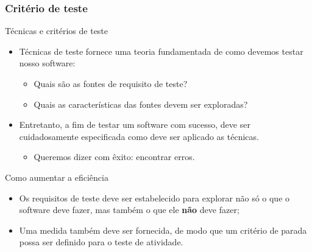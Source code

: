 \begin{frame}[parent={cmap:software-testing-foundations}, hasprev=false, hasnext=true]
\frametitle{Critério de teste}

\begin{block:fact}{Técnicas e critérios de teste}
\begin{itemize}
	\item Técnicas de teste fornece uma teoria fundamentada de como devemos testar nosso software:
	\begin{itemize}
		\item Quais são as fontes de requisito de teste?

		\item Quais as características das fontes devem ser exploradas?
	\end{itemize}

	\item Entretanto, a fim de testar um software com sucesso, deve ser cuidadosamente especificada como deve ser aplicado as técnicas.
	\begin{itemize}
		\item Queremos dizer com êxito: encontrar erros.
	\end{itemize}
\end{itemize}
\end{block:fact}


\begin{block:fact}{Como aumentar a eficiência}
\begin{itemize}
	\item {\small Os requisitos de teste deve ser estabelecido para explorar não só o que o software deve fazer, mas também o que ele \textbf{não} deve fazer;}

	\item {\small Uma medida também deve ser fornecida, de modo que um critério de parada possa ser definido para o teste de atividade.}
\end{itemize}
\end{block:fact}
\end{frame}



